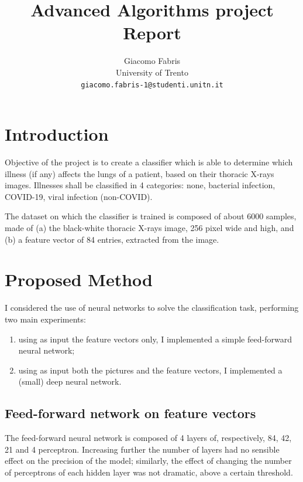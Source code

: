 \documentclass[10pt,letterpaper]{article}
\begin{document}
\title{\textsf{Advanced Algorithms project Report}}

\author{Giacomo Fabris\\
University of Trento\\
{\tt\small giacomo.fabris-1@studenti.unitn.it}
}

\maketitle

\section{Introduction}

Objective of the project is to create a classifier which is able to determine which illness (if any) affects the lungs of a patient, based on their thoracic X-rays images. Illnesses shall be classified in 4 categories: none, bacterial infection, COVID-19, viral infection (non-COVID).

The dataset on which the classifier is trained is composed of about 6000 samples, made of (a) the black-white thoracic X-rays image, 256 pixel wide and high, and (b) a feature vector of 84 entries, extracted from the image.

\section{Proposed Method}

I considered the use of neural networks to solve the classification task, performing two main experiments:
\begin{enumerate}
    \item using as input the feature vectors only, I implemented a simple feed-forward neural network;
    \item using as input both the pictures and the feature vectors, I implemented a (small) deep neural network.
\end{enumerate}

\subsection{Feed-forward network on feature vectors}

The feed-forward neural network is composed of 4 layers of, respectively, 84, 42, 21 and 4 perceptron.
Increasing further the number of layers had no sensible effect on the precision of the model; similarly, the effect of changing the number of perceptrons of each hidden layer was not dramatic, above a certain threshold.
\end{document}
